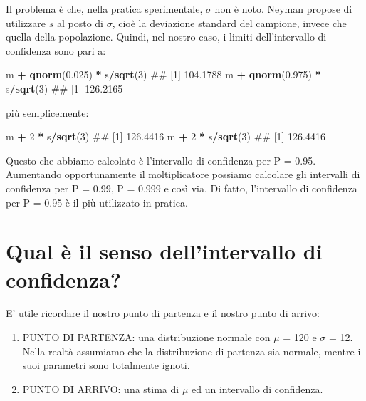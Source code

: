 \documentclass[a4paper,12pt,oneside]{book}
\providecommand{\tightlist}{%
  \setlength{\itemsep}{0pt}\setlength{\parskip}{0pt}}
\newenvironment{Shaded}{\begin{snugshade}}{\end{snugshade}}
\newcommand{\KeywordTok}[1]{\textcolor[rgb]{0.13,0.29,0.53}{\textbf{#1}}}
\newcommand{\DecValTok}[1]{\textcolor[rgb]{0.00,0.00,0.81}{#1}}
\newcommand{\FloatTok}[1]{\textcolor[rgb]{0.00,0.00,0.81}{#1}}
\newcommand{\StringTok}[1]{\textcolor[rgb]{0.31,0.60,0.02}{#1}}
\newcommand{\OperatorTok}[1]{\textcolor[rgb]{0.81,0.36,0.00}{\textbf{#1}}}
\newcommand{\NormalTok}[1]{#1}
\theoremstyle{definition}
\theoremstyle{definition}
\theoremstyle{definition}
\theoremstyle{remark}
\begin{document}
Il problema è che, nella pratica sperimentale, \(\sigma\) non è noto.
Neyman propose di utilizzare \(s\) al posto di \(\sigma\), cioè la
deviazione standard del campione, invece che quella della popolazione.
Quindi, nel nostro caso, i limiti dell'intervallo di confidenza sono
pari a:

\begin{Shaded}
\begin{Highlighting}[]
\NormalTok{m }\OperatorTok{+}\StringTok{ }\KeywordTok{qnorm}\NormalTok{(}\FloatTok{0.025}\NormalTok{) }\OperatorTok{*}\StringTok{ }\NormalTok{s}\OperatorTok{/}\KeywordTok{sqrt}\NormalTok{(}\DecValTok{3}\NormalTok{)}
\NormalTok{## [1] 104.1788}
\NormalTok{m }\OperatorTok{+}\StringTok{ }\KeywordTok{qnorm}\NormalTok{(}\FloatTok{0.975}\NormalTok{) }\OperatorTok{*}\StringTok{ }\NormalTok{s}\OperatorTok{/}\KeywordTok{sqrt}\NormalTok{(}\DecValTok{3}\NormalTok{)}
\NormalTok{## [1] 126.2165}
\end{Highlighting}
\end{Shaded}

più semplicemente:

\begin{Shaded}
\begin{Highlighting}[]
\NormalTok{m }\OperatorTok{+}\StringTok{ }\DecValTok{2} \OperatorTok{*}\StringTok{ }\NormalTok{s}\OperatorTok{/}\KeywordTok{sqrt}\NormalTok{(}\DecValTok{3}\NormalTok{)}
\NormalTok{## [1] 126.4416}
\NormalTok{m }\OperatorTok{+}\StringTok{ }\DecValTok{2} \OperatorTok{*}\StringTok{ }\NormalTok{s}\OperatorTok{/}\KeywordTok{sqrt}\NormalTok{(}\DecValTok{3}\NormalTok{)}
\NormalTok{## [1] 126.4416}
\end{Highlighting}
\end{Shaded}

Questo che abbiamo calcolato è l'intervallo di confidenza per P = 0.95.
Aumentando opportunamente il moltiplicatore possiamo calcolare gli
intervalli di confidenza per P = 0.99, P = 0.999 e così via. Di fatto,
l'intervallo di confidenza per P = 0.95 è il più utilizzato in pratica.

\section{Qual è il senso dell'intervallo di
confidenza?}\label{qual-e-il-senso-dellintervallo-di-confidenza}

E' utile ricordare il nostro punto di partenza e il nostro punto di
arrivo:

\begin{enumerate}
\def\labelenumi{\arabic{enumi}.}
\tightlist
\item
  PUNTO DI PARTENZA: una distribuzione normale con \(\mu\) = 120 e
  \(\sigma\) = 12. Nella realtà assumiamo che la distribuzione di
  partenza sia normale, mentre i suoi parametri sono totalmente ignoti.
\item
  PUNTO DI ARRIVO: una stima di \(\mu\) ed un intervallo di confidenza.
\end{enumerate}
\end{document}
